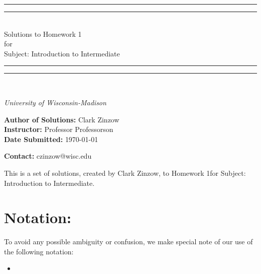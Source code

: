 \documentclass[twoside, titlepage]{amsart}
\makeatletter
\newcommand{\authorName}{Clark Zinzow}  %
\newcommand{\homeworkNumber}{1}  %
\newcommand{\subject}{Subject}  %
\newcommand{\courseNumber}{101}  %
\newcommand{\courseName}{Introduction to Intermediate}  %
\newcommand{\instructor}{Professor Professorson}  %
\newcommand{\submitDate}{\today}  %
\newcommand{\universityName}{University of Wisconsin-Madison}  %
\newcommand{\authorEmail}{czinzow@wisc.edu}  %
\theoremstyle{plain} %
\theoremstyle{definition}
\theoremstyle{remark}
\theoremstyle{notation}
\makeatother
\begin{document}
	
	\begin{titlepage}
		\centering
		\vspace*{\baselineskip}
		\rule{\textwidth}{1.6pt}\vspace*{-\baselineskip}\vspace*{2pt}
		\rule{\textwidth}{0.4pt}\\[\baselineskip]
		{\Huge Solutions to Homework \homeworkNumber \\[0.2\baselineskip]
			for \\[0.4\baselineskip]
			\subject\:\courseNumber: \courseName
		}\\[0.2\baselineskip]
		\rule{\textwidth}{0.4pt}\vspace*{-\baselineskip}\vspace*{3pt}
		\rule{\textwidth}{1.6pt}\\[\baselineskip]
		\vspace*{3\baselineskip}
		\huge  \par
		\vspace*{\baselineskip}
		{\itshape \universityName \par}
		\vspace*{3\baselineskip}
		\huge \textbf{Author of Solutions:} { \authorName } \\
		\vspace*{\baselineskip}
		\huge \textbf{Instructor:} { \instructor } \\
		\vspace*{\baselineskip}
		\huge \textbf{Date Submitted:} { \submitDate } \par
		\vspace*{\baselineskip}
		\huge \textbf{Contact:} { \authorEmail } \\
		\vspace*{\baselineskip}
	\end{titlepage}
	
	\makeatletter
	\providecommand\@dotsep{5}
	\makeatother
	\listoftodos\relax
	
	\clearpage
	
	This is a set of solutions, created by \authorName, to Homework \homeworkNumber\:for \subject\:\courseNumber: \courseName.
	\hspace{0pt} \\
	
	\section*{Notation:}
	To avoid any possible ambiguity or confusion, we make special note of our use of the following notation:
	\begin{itemize}
		\item 
	\end{itemize}
	
\end{document}
